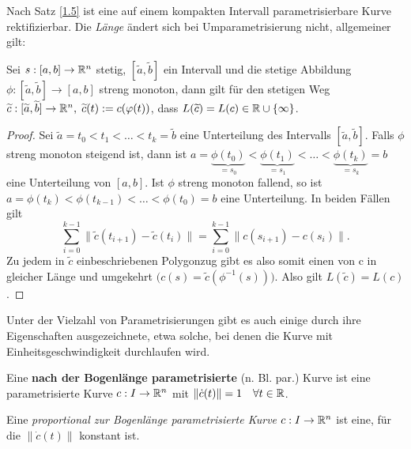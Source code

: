 \documentclass[11pt]{scrbook}
\begin{document}
Nach Satz \ref{1.5} ist eine auf einem kompakten Intervall parametrisierbare Kurve rektifizierbar. Die \emph{Länge} ändert sich bei Umparametrisierung nicht, allgemeiner gilt:
\begin{st}
Sei $s: [a,b] \to \mathbb{R}^n$ stetig, $[\tilde a, \tilde b]$ ein Intervall und die stetige Abbildung $\phi: [\tilde a, \tilde b] \to [a,b]$ streng monoton, dann gilt für den stetigen Weg $\widetilde c: [\widetilde a, \widetilde b] \to \mathbb{R}^n, \; \widetilde c(t) := c(\varphi(t))$, dass $L(\widetilde c) = L(c) \in \mathbb{R} \cup \{ \infty \}$.
\begin{proof}
Sei $\tilde a = t_0 < t_1 < \dots < t_k = \tilde b$ eine Unterteilung des Intervalls $[\tilde a, \tilde b]$. Falls $\phi$ streng monoton steigend ist, dann ist $a =\underbrace{\phi(t_0)}_{ = s_0} <\underbrace{\phi( t_1)}_{ = s_1} < \dots < \underbrace{\phi(t_k)}_{ = s_k} = b$ eine Unterteilung von $[a,b]$. Ist $\phi$ streng monoton fallend, so ist $a = \phi(t_k) < \phi(t_{k-1}) < \dots < \phi(t_0) = b$ eine Unterteilung. In beiden Fällen gilt 
\[
\sum_{i=0}^{k-1} \| \tilde c(t_{i+1}) - \tilde c(t_i) \| = \sum_{i=0}^{k-1} \| c(s_{i+1}) - c(s_i)\|.
\]
Zu jedem in $\tilde c$ einbeschriebenen Polygonzug gibt es also somit einen von c in gleicher Länge und umgekehrt $\big ( c(s) = \tilde c(\phi^{-1}(s)) \big)$. Also gilt $L(\tilde c) = L(c)$.
\end{proof}
\end{st}

Unter der Vielzahl von Parametrisierungen gibt es auch einige durch ihre Eigenschaften ausgezeichnete, etwa solche, bei denen die Kurve mit Einheitsgeschwindigkeit durchlaufen wird.

\begin{df}
Eine \textbf{nach der Bogenlänge parametrisierte} (n. Bl. par.) Kurve ist eine parametrisierte Kurve $c:I \to \mathbb{R}^n$ mit $\| \dot c(t) \| = 1 \quad \forall t \in \mathbb{R}$.
\begin{note}
Eine \emph{proportional zur Bogenlänge parametrisierte Kurve} $c:I \to \mathbb{R}^n$ ist eine, für die $\| \dot c(t) \|$ konstant ist.
\end{note}
\end{df}
\end{document}
